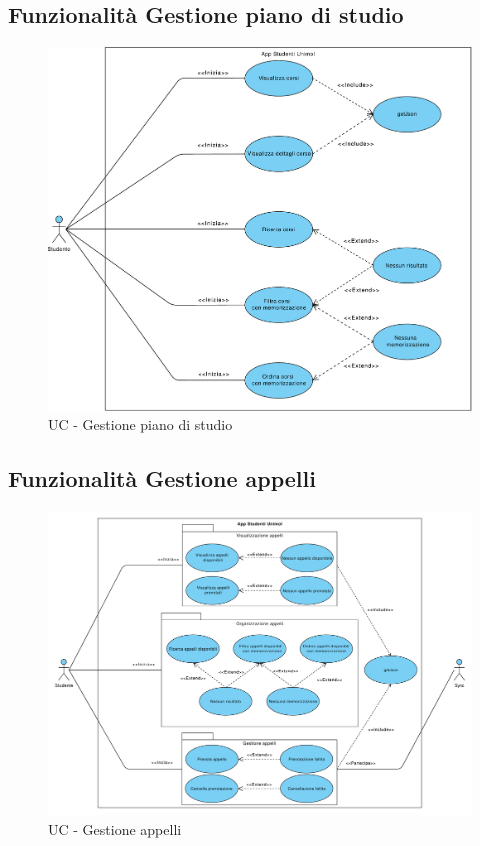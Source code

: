 \subsection{Funzionalità Gestione piano di studio}
\begin{figure} [h]
	\centering
	\includegraphics[width=6.5in]{imgs/gruppo1/use_case_diagrams/UCD1-gestione_piano_di_studio.pdf}
	\caption{UC - Gestione piano di studio}
	\label{diag:gestionePianoStudio}
\end{figure}
\clearpage

\subsection{Funzionalità Gestione appelli}
\begin{figure}[h]
	\includegraphics[width=6.5in]{imgs/gruppo1/use_case_diagrams/UCD2-gestione_appelli.pdf}
	\caption{UC - Gestione appelli}
	\label{diag:gestioneAppelli}
\end{figure}
\clearpage

